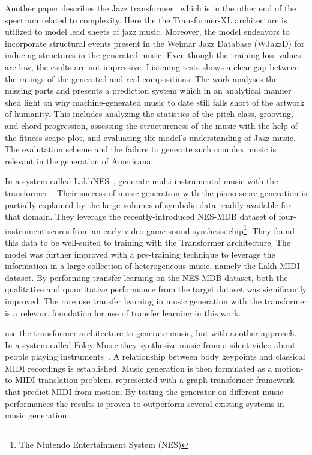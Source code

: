 \documentclass{IEEEtran}
\begin{document}
       Another paper describes the Jazz transformer~\cite{wu2020jazz} which is in the
       other end of the spectrum related to complexity. Here the the Transformer-XL
       architecture is utilized to model lead sheets of jazz music. Moreover, the model
       endeavors to incorporate structural events present in the Weimar Jazz Database
       (WJazzD) for inducing structures in the generated music. Even though the training
       loss values are low, the esults are not impressive. Listening tests shows a clear
       gap between the ratings of the generated and real compositions. The work analyses
       the missing parts and presents a prediction system which in an analytical manner
       shed light on why machine-generated music to date still falls short of the artwork
       of humanity. This includes analyzing the statistics of
       the pitch class, grooving, and chord progression, assessing the structureness of
       the music with the help of the fitness scape plot, and evaluating the model’s
       understanding of Jazz music. The evalutation scheme and the failure to generate such complex music is relevant in the generation of Americana.

       In a system called LakhNES~\citeauthor{donahue2019lakhnes},
       generate multi-instrumental music with the transformer~\cite{donahue2019lakhnes}.
       Their success of music generation with the piano score generation is partially
       explained by the large volumes of symbolic data readily available for that domain.
       They leverage the recently-introduced NES-MDB dataset of four-instrument scores
       from an early video game sound synthesis
       chip\footnote{The Nintendo Entertainment System (NES)}.
       They found this data to be well-suited to training with the
       Transformer architecture. The model was further improved with a pre-training
       technique to leverage the information in a large collection of heterogeneous music,
       namely the Lakh MIDI dataset. By performing transfer learning on the NES-MDB dataset,
       both the qualitative and quantitative performance from the target dataset was
       significantly improved. The rare use transfer learning in music generation with the transformer is a relevant foundation for use of transfer learning in this work.
       
        \citeauthor{gan2020foley} use
        the transformer architecture to generate music, but with another approach.
        In a system called Foley Music they synthesize music from a silent video about
        people playing instruments~\cite{gan2020foley}.
        A relationship between body keypoints and classical MIDI recordings is established.
        Music generation is then formulated as a motion-to-MIDI translation problem,
        represented with a graph transformer framework that predict MIDI from motion.
        By testing the generator on different music performances the results is proven to outperform several existing systems in music generation.
\end{document}
